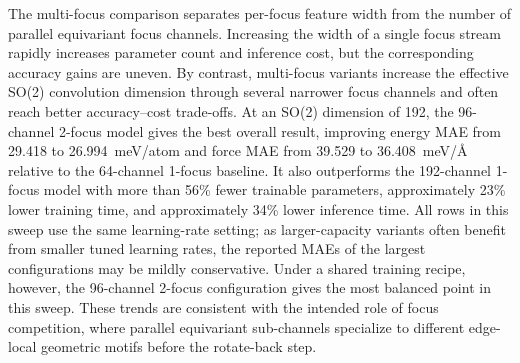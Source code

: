 The multi-focus comparison separates per-focus feature width from the number of
parallel equivariant focus channels. Increasing the width of a single focus
stream rapidly increases parameter count and inference cost, but the
corresponding accuracy gains are uneven. By contrast, multi-focus variants
increase the effective SO(2) convolution dimension through several narrower
focus channels and often reach better accuracy--cost trade-offs. At an SO(2)
dimension of 192, the 96-channel 2-focus model gives the best overall result,
improving energy MAE from 29.418 to 26.994~meV/atom and force MAE from 39.529
to 36.408~meV/\AA{} relative to the 64-channel 1-focus baseline. It also
outperforms the 192-channel 1-focus model with more than 56\% fewer trainable
parameters, approximately 23\% lower training time, and approximately 34\%
lower inference time. All rows in this sweep use the same learning-rate
setting; as larger-capacity variants often benefit from smaller tuned learning
rates, the reported MAEs of the largest configurations may be mildly
conservative. Under a shared training recipe, however, the 96-channel 2-focus
configuration gives the most balanced point in this sweep. These trends are
consistent with the intended role of focus competition, where parallel
equivariant sub-channels specialize to different edge-local geometric motifs
before the rotate-back step.

